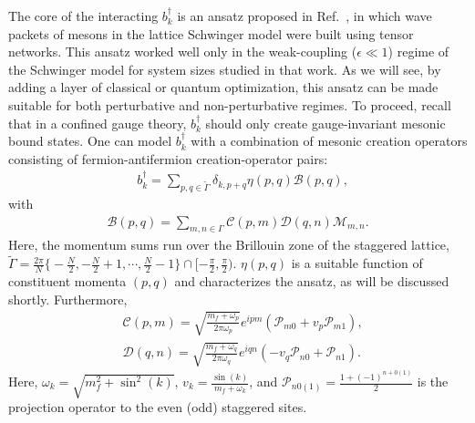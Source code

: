 \documentclass[a4paper,onecolumn,11pt,accepted=2024-10-11]{quantumarticle}
\begin{document}
The core of the interacting $b_{k}^{\dagger}$ is an ansatz proposed in Ref.~\cite{Rigobello:2021fxw}, in which wave packets of mesons in the lattice Schwinger model were built using tensor networks. This ansatz worked well only in the weak-coupling ($\epsilon \ll 1$) regime of the Schwinger model for system sizes studied in that work. As we will see, by adding a layer of classical or quantum optimization, this ansatz can be made suitable for both perturbative and non-perturbative regimes. To proceed, recall that in a confined gauge theory, $ b_{k}^{\dagger} $ should only create gauge-invariant mesonic bound states. One can model $ b_{k}^{\dagger} $ with a combination of mesonic creation operators consisting of fermion-antifermion creation-operator pairs:
%
\begin{align}
&b_{k}^{\dagger} = \sum_{p,q \in \widetilde{\Gamma}} \delta_{k, p+q} \eta(p, q) \mathcal{B}(p,q),
\label{eq:ansatz1}
\end{align}
%
with
%
\begin{align}
\mathcal{B}(p,q)=\sum_{m,n \in \Gamma} \mathscr{C}(p,m)\mathscr{D}(q,n) \mathcal{M}_{m,n}.
\label{eq:B-def}
\end{align}
%
Here, the momentum sums run over the Brillouin zone of the staggered lattice, $\widetilde{\Gamma} = \frac{2\pi}{N} \big\{-\frac{N}{2},-\frac{N}{2}+1, \cdots, \frac{N}{2}-1 \big\}\cap [-\frac{\pi}{2}, \frac{\pi}{2})$. 
$\eta(p,q)$ is a suitable function of constituent momenta $(p,q)$ and characterizes the ansatz, as will be discussed shortly.
Furthermore,
\begin{subequations}
\begin{align} 
&\mathscr{C}(p,m)=\sqrt{\frac{m_f+\omega_p}{2\pi\omega_p}} {e^{ipm}}\left(\mathcal{P}_{m0}+v_p\mathcal{P}_{m1}\right),
\\
&\mathscr{D}(q,n)=\sqrt{\frac{m_f+\omega_q}{2\pi\omega_q}} {e^{iqn}}\left(-v_q\mathcal{P}_{n0}+\mathcal{P}_{n1}\right).
\end{align}
\end{subequations}
%
Here, $\omega_k=\sqrt{m_f^2+\sin^2(k)}$, $v_k=\frac{\sin(k)}{m_f+\omega_k}$, and $\mathcal{P}_{n0(1)}=\frac
{1+(-1)^{n+0(1)}}{2}$ is the projection operator to the even (odd) staggered sites.
\end{document}
